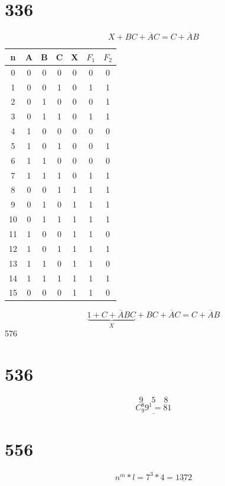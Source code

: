 \documentclass[a4paper, 12pt]{article}
\begin{document}
\section*{336}
\[
       X + BC + \overline{A}C = C + \overline{A}B
\]
\begin{center}
       \begin{tabular}{| c | c c c | c | c  | c |} 
       \hline
       n & A & B & C & X & $ F_1 $ & $ F_2 $ \\ 
       \hline
       0 & 0 & 0 & 0 & 0 & 0 & 0\\ 
       \hline
       1 & 0 & 0 & 1 & 0 & 1 & 1\\ 
       \hline
       2 & 0 & 1 & 0 & 0 & 0 & 1 \\
       \hline
       3 & 0 & 1 & 1 & 0 & 1 & 1\\
       \hline
       4 & 1 & 0 & 0 & 0 & 0 & 0\\
       \hline
       5 & 1 & 0 & 1 & 0 & 0 & 1\\
       \hline
       6 & 1 & 1 & 0 & 0 & 0 & 0\\
       \hline
       7 & 1 & 1 & 1 & 0 & 1 & 1\\
       \hline
       8 & 0 & 0 & 1 & 1 & 1 & 1\\ 
       \hline
       9 & 0 & 1 & 0 & 1 & 1 & 1 \\
       \hline
       10 & 0 & 1 & 1 & 1 & 1 & 1\\
       \hline
       11 & 1 & 0 & 0 & 1 & 1 & 0\\
       \hline
       12 & 1 & 0 & 1 & 1 & 1 & 1\\
       \hline
       13 & 1 & 1 & 0 & 1 & 1 & 0\\
       \hline
       14 & 1 & 1 & 1 & 1 & 1 & 1\\
       \hline
       15 & 0 & 0 & 0 & 1 & 1 & 0\\ 
       \hline
       
      \end{tabular}
\end{center}
\[
       \underbrace{1 + C + \overline{A}BC}_X + BC + \overline{A}C = C + \overline{A}B
\]576
\section*{536}
\[
       9 \quad 5 \quad 8
\]
\[
       \underline{C^8_9 9^1 = 81} 
\]
\section*{556}
\[
       n^m * l = 7^3 * 4 = \underline{1372}
\]
\newpage
\end{document}
